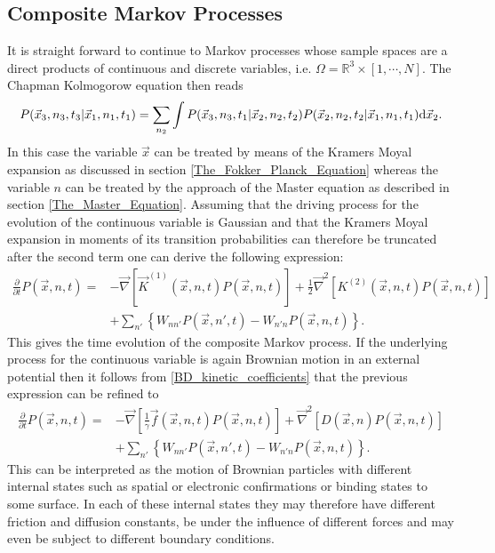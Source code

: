 \subsection{Composite Markov Processes}
\label{Multivariate_Markov_Processes}
It is straight forward to continue to Markov processes whose sample spaces are a direct products of continuous and discrete variables, i.e. $\Omega = \mathbb{R}^{3} \times [1,\cdots, N]$. The Chapman Kolmogorow equation then reads
\begin{equation}
    P(\vec{x}_3,n_3,t_3|\vec{x}_1,n_1,t_1) = \sum_{n_2} \int P(\vec{x}_3,n_3,t_1|\vec{x}_2,n_2,t_2)P(\vec{x}_2,n_2,t_2|\vec{x}_1,n_1,t_1) {\rm d} \vec{x}_2.
    \label{MCK}
\end{equation}
In this case the variable $\vec{x}$ can be treated by means of the Kramers Moyal expansion as discussed in section \ref{The_Fokker_Planck_Equation} whereas the variable $n$ can be treated by the approach of the Master equation as described in section \ref{The_Master_Equation}. Assuming that the driving process for the evolution of the continuous variable is Gaussian and that the Kramers Moyal expansion in moments of its transition probabilities can therefore be truncated after the second term one can derive the following expression:
\begin{align}
    \frac{\partial}{\partial t } P(\vec{x},n,t) =   &- \vec{ \nabla } \left[\vec{K}^{(1)}(\vec{x},n,t)P(\vec{x},n,t) \right] + \frac{1}{2}\vec{\nabla}^{2}\left[ K^{(2)}(\vec{x},n,t)P(\vec{x},n,t) \right] \nonumber \\
                                                    &+ \sum_{n'} \left\{ W_{nn'}P(\vec{x},n',t) - W_{n'n}P(\vec{x},n,t)\right\}.
    \label{composite_mp}
\end{align}
This gives the time evolution of the composite Markov process. If the underlying process for the continuous variable is again Brownian motion in an external potential then it follows from \eqref{BD_kinetic_coefficients} that the previous expression can be refined to
\begin{align}
    \frac{\partial}{\partial t } P(\vec{x},n,t) =   &- \vec{ \nabla } \left[\frac{1}{\gamma}\vec{f}(\vec{x},n,t)P(\vec{x},n,t) \right] +\vec{\nabla}^{2}\left[ D(\vec{x},n)P(\vec{x},n,t) \right] \nonumber \\
                                                    &+ \sum_{n'} \left\{ W_{nn'}P(\vec{x},n',t) - W_{n'n}P(\vec{x},n,t)\right\}.
    \label{fpmeq1}
\end{align}
This can be interpreted as the motion of Brownian particles with different internal states such as spatial or electronic confirmations or binding states to some surface. In each of these internal states they may therefore have different friction and diffusion constants, be under the influence of different forces and may even be subject to different boundary conditions. \\

